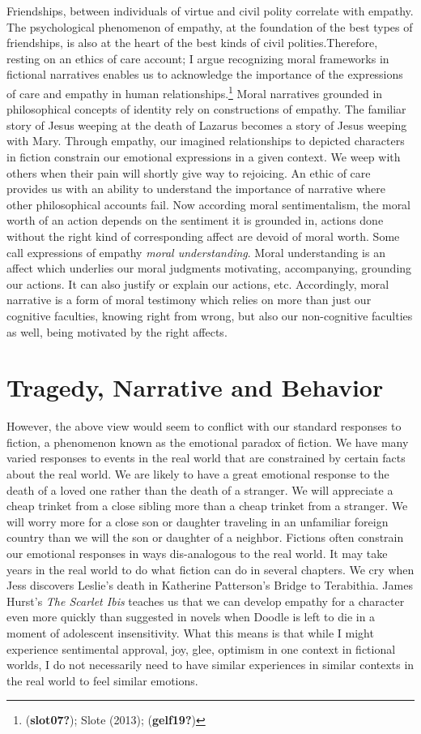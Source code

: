\documentclass[12pt]{book}
\theoremstyle{definition}
\theoremstyle{remark}
\begin{document}
Friendships, between individuals of virtue and civil polity correlate with empathy. The psychological phenomenon of empathy, at the foundation of the best types of friendships, is also at the heart of the best kinds of civil polities.Therefore, resting on an ethics of care account; I argue recognizing moral frameworks in fictional narratives enables us to acknowledge the importance of the expressions of care and empathy in human relationships.\footnote{(\textbf{slot07?}); Slote (2013); (\textbf{gelf19?})} Moral narratives grounded in philosophical concepts of identity rely on constructions of empathy. The familiar story of Jesus weeping at the death of Lazarus becomes a story of Jesus weeping with Mary. Through empathy, our imagined relationships to depicted characters in fiction constrain our emotional expressions in a given context. We weep with others when their pain will shortly give way to rejoicing. An ethic of care provides us with an ability to understand the importance of narrative where other philosophical accounts fail. Now according moral sentimentalism, the moral worth of an action depends on the sentiment it is grounded in, actions done without the right kind of corresponding affect are devoid of moral worth. Some call expressions of empathy \emph{moral understanding}. Moral understanding is an affect which underlies our moral judgments motivating, accompanying, grounding our actions. It can also justify or explain our actions, etc. Accordingly, moral narrative is a form of moral testimony which relies on more than just our cognitive faculties, knowing right from wrong, but also our non-cognitive faculties as well, being motivated by the right affects.

\section{Tragedy, Narrative and Behavior}\label{tragedy-narrative-and-behavior-1}

However, the above view would seem to conflict with our standard responses to fiction, a phenomenon known as the emotional paradox of fiction. We have many varied responses to events in the real world that are constrained by certain facts about the real world. We are likely to have a great emotional response to the death of a loved one rather than the death of a stranger. We will appreciate a cheap trinket from a close sibling more than a cheap trinket from a stranger. We will worry more for a close son or daughter traveling in an unfamiliar foreign country than we will the son or daughter of a neighbor. Fictions often constrain our emotional responses in ways dis-analogous to the real world. It may take years in the real world to do what fiction can do in several chapters. We cry when Jess discovers Leslie's death in Katherine Patterson's Bridge to Terabithia. James Hurst's \emph{The Scarlet Ibis} teaches us that we can develop empathy for a character even more quickly than suggested in novels when Doodle is left to die in a moment of adolescent insensitivity. What this means is that while I might experience sentimental approval, joy, glee, optimism in one context in fictional worlds, I do not necessarily need to have similar experiences in similar contexts in the real world to feel similar emotions.
\end{document}
